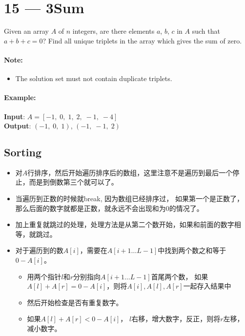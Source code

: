 \section{15 --- 3Sum}
Given an array $ A $ of $ n $ integers, are there elements $ a $, $ b $, $ c $ in $ A $ such that $ a + b + c = 0 $? Find all unique triplets in the array which gives the sum of zero.

\paragraph{Note:}

\begin{itemize}
	\item The solution set must not contain duplicate triplets.
\end{itemize}

\paragraph{Example:}
\begin{flushleft}
\textbf{Input}: $ A =  [-1,\; 0,\; 1,\; 2,\; -1,\; -4]$
\\
\textbf{Output}: $ (-1,\;0,\;1) $, $ (-1,\;-1,\;2) $
\end{flushleft}

\subsection{Sorting}
\begin{itemize}
\item 对$ A $行排序，然后开始遍历排序后的数组，这里注意不是遍历到最后一个停止，而是到倒数第三个就可以了。
\item 当遍历到正数的时候就break, 因为数组已经排序过， 如果第一个是正数了，那么后面的数字就都是正数，就永远不会出现和为0的情况了。
\item 加上重复就跳过的处理，处理方法是从第二个数开始，如果和前面的数字相等，就跳过。
\item 对于遍历到的数$A[i]$，需要在$A[i+1\ldots L-1]$中找到两个数之和等于$ 0-A[i] $。
\begin{itemize}
\item 用两个指针$l$和$r$分别指向$A[i+1\ldots L-1]$首尾两个数， 如果$A[l]+A[r] = 0-A[i]$，则将$A[i], A[l], A[r]$一起存入结果中
\item 然后开始检查是否有重复数字。
\item 如果$A[l]+A[r] < 0-A[i]$， $l$右移，增大数字，反正，则将$r$左移，减小数字。
\end{itemize}
\end{itemize}

